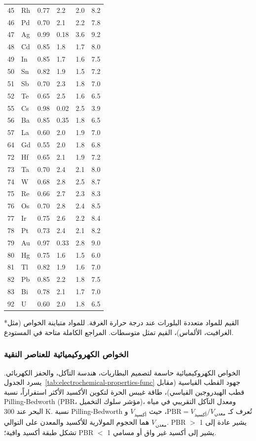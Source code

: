\documentclass[11pt,a4paper]{article}
\begin{document}
\begin{otherlanguage}{arabic}
\begin{longtable}{p{0.8cm}p{1.2cm}p{2.2cm}p{2.2cm}p{2.2cm}p{2.2cm}}
			45 & Rh & 0.77 & 2.2 & 2.0 & 8.2 \\
			46 & Pd & 0.70 & 2.1 & 2.2 & 7.8 \\
			47 & Ag & 0.99 & 0.18 & 3.6 & 9.2 \\
			48 & Cd & 0.85 & 1.8 & 1.7 & 8.0 \\
			49 & In & 0.85 & 1.7 & 1.6 & 7.5 \\
			50 & Sn & 0.82 & 1.9 & 1.5 & 7.2 \\
			51 & Sb & 0.70 & 2.3 & 1.8 & 7.0 \\
			52 & Te & 0.65 & 2.5 & 1.6 & 6.5 \\
			55 & Cs & 0.98 & 0.02 & 2.5 & 3.9 \\
			56 & Ba & 0.85 & 0.35 & 1.8 & 6.5 \\
			57 & La & 0.60 & 2.0 & 1.9 & 7.0 \\
			64 & Gd & 0.55 & 2.0 & 1.8 & 6.8 \\
			72 & Hf & 0.65 & 2.1 & 1.9 & 7.2 \\
			73 & Ta & 0.70 & 2.4 & 2.1 & 8.0 \\
			74 & W  & 0.68 & 2.8 & 2.5 & 8.7 \\
			75 & Re & 0.66 & 2.7 & 2.3 & 8.3 \\
			76 & Os & 0.70 & 2.8 & 2.4 & 8.5 \\
			77 & Ir & 0.75 & 2.6 & 2.2 & 8.4 \\
			78 & Pt & 0.73 & 2.4 & 2.1 & 8.2 \\
			79 & Au & 0.97 & 0.33 & 2.8 & 9.0 \\
			80 & Hg & 0.75 & 1.6 & 1.5 & 6.0 \\
			81 & Tl & 0.82 & 1.9 & 1.6 & 7.0 \\
			82 & Pb & 0.85 & 2.2 & 1.8 & 7.5 \\
			83 & Bi & 0.78 & 2.1 & 1.7 & 7.0 \\
			92 & U  & 0.60 & 2.0 & 1.8 & 6.5 \\
			\bottomrule
		\end{longtable}
		*القيم للمواد متعددة البلورات عند درجة حرارة الغرفة. للمواد متباينة الخواص (مثل الغرافيت، الألماس)، القيم تمثل متوسطات. المراجع الكاملة متاحة في المستودع.
		
		\subsubsection{الخواص الكهروكيميائية للعناصر النقية}
		\label{subsec:electrochemical-properties-func}
		
		الخواص الكهروكيميائية حاسمة لتصميم البطاريات، هندسة التآكل، والحفز الكهربائي. يسرد الجدول~\ref{tab:electrochemical-properties-func} جهود القطب القياسية (مقابل قطب الهيدروجين القياسي)، طاقة غيبس الحرة لتكوين الأكسيد الأكثر استقراراً، نسبة Pilling-Bedworth (PBR، مؤشر سلوك التخميل)، ومعدل التآكل التقريبي في مياه البحر عند 300 K. نسبة Pilling-Bedworth تُعرف كـ \(\text{PBR} = V_{\text{أكسيد}} / V_{\text{معدن}}\)، حيث \(V_{\text{أكسيد}}\) و \(V_{\text{معدن}}\) هما الحجوم المولارية للأكسيد والمعدن على التوالي. PBR $>$ 1 يشير عادة إلى تشكل طبقة أكسيد واقية؛ PBR $<$ 1 يشير إلى أكسيد غير واق أو مسامي.
		

\end{otherlanguage}
\end{document}
